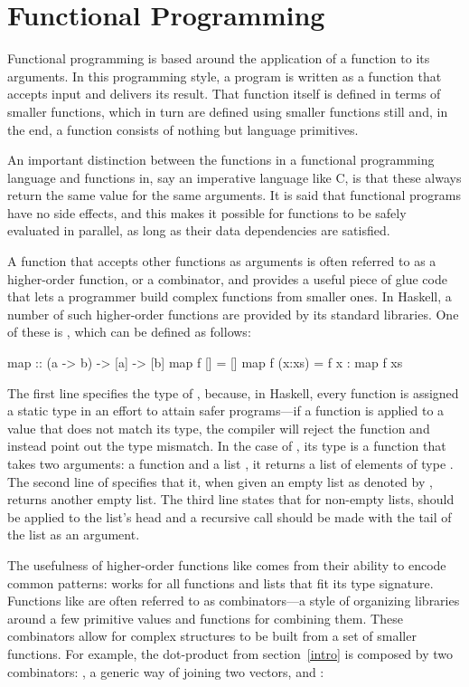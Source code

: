\documentclass[../paper.tex]{subfiles}
\begin{document}
\section{Functional Programming}
\label{functional}

Functional programming is based around the application of a function to its arguments. In this programming style, a program is written as a function that accepts input and delivers its result. That function itself is defined in terms of smaller functions, which in turn are defined using smaller functions still and, in the end, a function consists of nothing but language primitives.

An important distinction between the functions in a functional programming language and functions in, say an imperative language like C, is that these always return the same value for the same arguments. It is said that functional programs have no side effects, and this makes it possible for functions to be safely evaluated in parallel, as long as their data dependencies are satisfied.

A function that accepts other functions as arguments is often referred to as a higher-order function, or a combinator, and provides a useful piece of glue code that lets a programmer build complex functions from smaller ones. In Haskell, a number of such higher-order functions are provided by its standard libraries. One of these is , which can be defined as follows:

\begin{code}
map :: (a -> b) -> [a] -> [b]
map f []     = []
map f (x:xs) = f x : map f xs
\end{code}

The first line specifies the type of , because, in Haskell, every function is assigned a static type in an effort to attain safer programs---if a function is applied to a value that does not match its type, the compiler will reject the function and instead point out the type mismatch. In the case of , its type is a function that takes two arguments: a function  and a list , it returns a list of elements of type . The second line of  specifies that it, when given an empty list as denoted by \codei{[]}, returns another empty list. The third line states that for non-empty lists,  should be applied to the list's head and a recursive call should be made with the tail of the list as an argument.

The usefulness of higher-order functions like  comes from their ability to encode common patterns:  works for all functions and lists that fit its type signature. Functions like  are often referred to as combinators---a style of organizing libraries around a few primitive values and functions for combining them. These combinators allow for complex structures to be built from a set of smaller functions. For example, the dot-product from section~\ref{intro} is composed by two combinators: , a generic way of joining two vectors, and :
\end{document}

